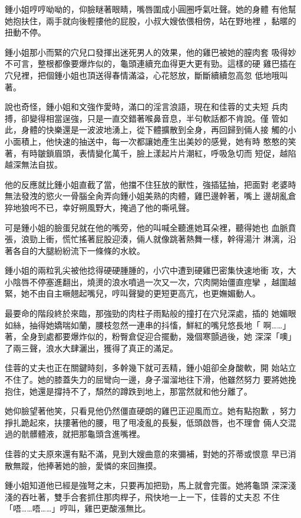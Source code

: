 鍾小姐哼哼呦呦的，仰臉瞇著眼睛，嘴唇圍成小圓圈呼氣吐聲。她的身體
有他幫她抱扶住，兩手就向後輕摟他的屁股，小叔大嫂依偎相傍，站在野地裡
，黏暱的扭動不停。

鍾小姐那小而緊的穴兒口發揮出迷死男人的效果，他的雞巴被她的膣肉套
吸得妙不可言，整根都像要爆炸似的，龜頭連續充血得更大更有勁。這樣的硬
雞巴插在穴兒裡，把個鍾小姐也頂送得春情滿溢，心花怒放，斷斷續續忽高忽
低地哦叫著。

說也奇怪，鍾小姐和文強作愛時，滿口的淫言浪語，現在和佳蓉的丈夫短
兵肉搏，卻變得相當逞強，只是一直交錯著喉鼻音息，半句軟話都不肯說。僅
管如此，身體的快樂還是一波波地湧上，從下體擴散到全身，再回歸到倆人接
觸的小小面積上，他快速的抽送中，每一次都讓她產生出美妙的感覺，她有時
憨憨的笑著，有時皺鎖眉頭，表情變化萬千，臉上漾起片片潮紅，呼吸急切而
短促，越陷越深無法自拔。

他的反應就比鍾小姐直截了當，他擋不住狂放的獸性，強插猛抽，把面對
老婆時無法發洩的慾火一骨腦全肏弄向鍾小姐美熟的肉體，雞巴邊幹著，嘴上
邊胡亂倉猝地狼呺不已，幸好朔風野大，掩過了他的嘶吼聲。

可是鍾小姐的臉蛋兒就在他的嘴旁，他的叫喊全聽進她耳朵裡，聽得她也
血脈賁張，浪勁上衝，慌忙搖著屁股迎湊，倆人就像跳著熱舞一樣，幹得湯汁
淋漓，沿著各自的大腿紛紛流下一條條的水紋。

鍾小姐的兩粒乳尖被他捻得硬硬腫腫的，小穴中遭到硬雞巴密集快速地衝
攻，大小陰唇不停塞進翻出，燒燙的浪水噴過一次又一次，穴肉開始僵直痙攣
，越圍越緊，她不由自主噘翹起嘴兒，哼叫聲變的更短更高亢，也更嫵媚動人。

最要命的階段終於來臨，那強勁的肉柱子雨點般的撞打在穴兒深處，插的
她媚眼如絲，抽得她嬌喘如蘭，腰枝忽然一連串的抖慉，鮮紅的嘴兒悠長地「
啊……」著，全身到處都要爆炸似的，粉臀倉促迎合擺動，幾個寒顫過後，她
深深「噢」了兩三聲，浪水大肆灑出，獲得了真正的滿足。

佳蓉的丈夫也正在關鍵時刻，多幹幾下就可丟精，鍾小姐卻全身酸軟，開
始站立不住了。她的膝蓋失力的屈彎向一邊，身子溜溜地往下滑，他雖然努力
要將她挽抱住，她還是撐持不了，頹然的蹲跌到地上，那當然就和他分離了。

她仰臉望著他笑，只看見他仍然僵直硬朗的雞巴正迎風而立。她有點抱歉
，努力掙扎跪起來，扶摟著他的腰，甩了甩凌亂的長髮，低頭啟唇，也不理會
倆人交混過的骯髒體液，就把那龜頭含進嘴裡。

佳蓉的丈夫原來還有點不滿，見到大嫂曲意的來彌補，對她的芥蒂或恨意
早已消散無蹤，他捧著她的臉，愛憐的來回撫摸。

鍾小姐知道他已經是強弩之末，只要再加把勁，馬上就會完蛋。她將龜頭
深深淺淺的吞吐著，雙手合套抓住那肉桿子，飛快地一上一下，佳蓉的丈夫忍
不住「唔……唔……」哼叫，雞巴更酸漲無比。

